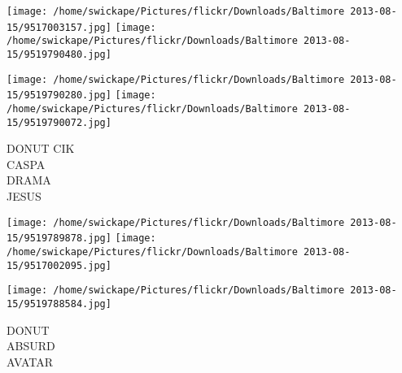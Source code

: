 \documentclass[10pt,letterpaper]{article}
\begin{document}
\texttt{[image: /home/swickape/Pictures/flickr/Downloads/Baltimore 2013-08-15/9517003157.jpg]}
\texttt{[image: /home/swickape/Pictures/flickr/Downloads/Baltimore 2013-08-15/9519790480.jpg]}

\texttt{[image: /home/swickape/Pictures/flickr/Downloads/Baltimore 2013-08-15/9519790280.jpg]}
\texttt{[image: /home/swickape/Pictures/flickr/Downloads/Baltimore 2013-08-15/9519790072.jpg]}

DONUT CIK\\
CASPA\\
DRAMA\\
JESUS\\
\pagebreak

\texttt{[image: /home/swickape/Pictures/flickr/Downloads/Baltimore 2013-08-15/9519789878.jpg]}
\texttt{[image: /home/swickape/Pictures/flickr/Downloads/Baltimore 2013-08-15/9517002095.jpg]}

\texttt{[image: /home/swickape/Pictures/flickr/Downloads/Baltimore 2013-08-15/9519788584.jpg]}

DONUT\\
ABSURD\\
AVATAR\\
\pagebreak
\end{document}
